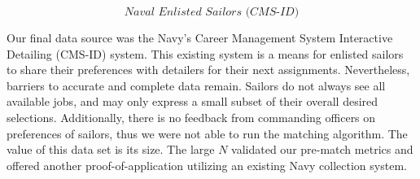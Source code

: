 \[\textit{Naval Enlisted Sailors (CMS-ID)}\]

Our final data source was the Navy’s Career Management System Interactive Detailing (CMS-ID) system. This existing system is a means for enlisted sailors to share their preferences with detailers for their next assignments. Nevertheless, barriers to accurate and complete data remain.  Sailors do not always see all available jobs, and may only express a small subset of their overall desired selections. Additionally, there is no feedback from commanding officers on preferences of sailors, thus we were not able to run the matching algorithm. The value of this data set is its size.  The large $N$ validated our pre-match metrics and offered another proof-of-application utilizing an existing Navy collection system. 
